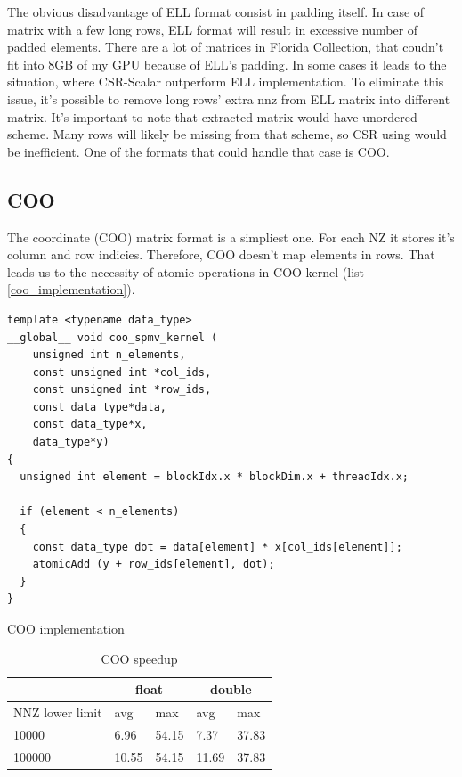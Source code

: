 \documentclass{article}
\begin{document}
The obvious disadvantage of ELL format consist in padding itself. In case of matrix with a few long rows, ELL format will result in 
excessive number of padded elements. There are a lot of matrices in Florida Collection, that coudn't fit into 8GB of my GPU because
of ELL's padding. In some cases it leads to the situation, where CSR-Scalar outperform ELL implementation. To eliminate this
issue, it's possible to remove long rows' extra nnz from ELL matrix into different matrix. It's important to note that
extracted matrix would have unordered scheme. Many rows will likely be missing from that scheme, so CSR using would be inefficient. 
One of the formats that could handle that case is COO.

\subsection{COO}

The coordinate (COO) matrix format is a simpliest one. For each NZ it stores it's column and row indicies. Therefore, COO doesn't 
map elements in rows. That leads us to the necessity of atomic operations in COO kernel (list \ref{coo_implementation}).

\begin{listing}[H]
\begin{verbatim}
template <typename data_type>
__global__ void coo_spmv_kernel (
    unsigned int n_elements,
    const unsigned int *col_ids,
    const unsigned int *row_ids,
    const data_type*data,
    const data_type*x,
    data_type*y)
{
  unsigned int element = blockIdx.x * blockDim.x + threadIdx.x;

  if (element < n_elements)
  {
    const data_type dot = data[element] * x[col_ids[element]];
    atomicAdd (y + row_ids[element], dot);
  }
}
\end{verbatim}
\caption{COO implementation}
\label{coo_implementation}
\end{listing}

\begin{table}[H]
	\centering
	\begin{tabular}{ |p{2.6cm}||p{1cm}|p{1cm}|p{1cm}|p{1cm}|  }
	 \hline
		& \multicolumn{2}{|c|}{float} & \multicolumn{2}{|c|}{double}\\
	 \hline
	 NNZ lower limit & avg & max & avg & max  \\
	 \hline
	 10000  & 6.96  & 54.15 & 7.37  & 37.83 \\
	 100000 & 10.55 & 54.15 & 11.69 & 37.83 \\
	 \hline
	\end{tabular}
	\caption{COO speedup}
  \label{csr_coo_speedup_table}
\end{table}
\end{document}
